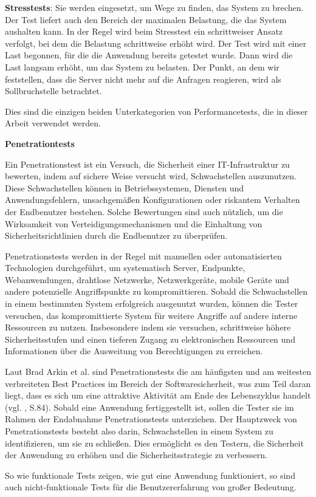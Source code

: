 \textbf{Stresstests}: Sie werden eingesetzt, um Wege zu finden, das System zu
brechen. Der Test liefert auch den Bereich der maximalen Belastung,
die das System aushalten kann. In der Regel wird beim Stresstest ein
schrittweiser Ansatz verfolgt, bei dem die Belastung schrittweise
erhöht wird. Der Test wird mit einer Last begonnen, für die die Anwendung
bereits getestet wurde. Dann wird die Last langsam erhöht, um das System
zu belasten. Der Punkt, an dem wir feststellen, dass die Server nicht mehr
auf die Anfragen reagieren, wird als Sollbruchstelle betrachtet.


Dies sind die einzigen beiden Unterkategorien von Performancetests,
die in dieser Arbeit verwendet werden.



\textbf{Penetrationtests}

Ein Penetrationstest ist ein Versuch, die Sicherheit einer IT-Infrastruktur
zu bewerten, indem auf sichere Weise versucht wird, Schwachstellen
auszunutzen. Diese Schwachstellen können in Betriebssystemen, Diensten
und Anwendungsfehlern, unsachgemäßen Konfigurationen oder riskantem
Verhalten der Endbenutzer bestehen. Solche Bewertungen sind auch nützlich,
um die Wirksamkeit von Verteidigungsmechanismen und die Einhaltung von
Sicherheitsrichtlinien durch die Endbenutzer zu überprüfen.


Penetrationstests werden in der Regel mit manuellen oder automatisierten
Technologien durchgeführt, um systematisch Server, Endpunkte, Webanwendungen,
drahtlose Netzwerke, Netzwerkgeräte, mobile Geräte und andere potenzielle
Angriffspunkte zu kompromittieren. Sobald die Schwachstellen in einem
bestimmten System erfolgreich ausgenutzt wurden, können die Tester versuchen,
das kompromittierte System für weitere Angriffe auf andere interne Ressourcen
zu nutzen. Insbesondere indem sie versuchen, schrittweise höhere
Sicherheitsstufen und einen tieferen Zugang zu elektronischen Ressourcen
und Informationen über die Ausweitung von Berechtigungen zu erreichen.


Laut Brad Arkin et al. sind Penetrationstests die am häufigsten und am
weitesten verbreiteten Best Practices im Bereich der Softwaresicherheit,
was zum Teil daran liegt, dass es sich um eine attraktive Aktivität am
Ende des Lebenszyklus handelt (vgl. \cite{1392709}, S.84).  Sobald eine
Anwendung fertiggestellt ist, sollen die Tester sie im Rahmen der Endabnahme
Penetrationstests unterziehen. Der Hauptzweck von Penetrationstests besteht
also darin, Schwachstellen in einem System zu identifizieren, um sie zu
schließen. Dies ermöglicht es den Testern, die Sicherheit der Anwendung
zu erhöhen und die Sicherheitsstrategie zu verbessern.


So wie funktionale Tests zeigen, wie gut eine Anwendung funktioniert,
so sind auch nicht-funktionale Tests für die Benutzererfahrung von
großer Bedeutung.


